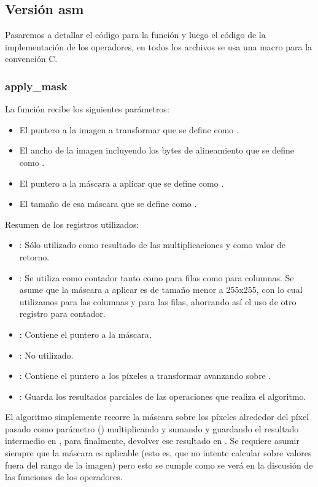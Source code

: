\subsection{Versi\'on asm}
Pasaremos a detallar el c\'odigo para la funci\'on  y luego el c\'odigo de la implementaci\'on de los 
operadores, en todos los archivos se usa una macro para la convenci\'on C.

\subsubsection{apply\_mask}
La funci\'on recibe los siguientes par\'ametros:
\begin{itemize}
	\item El puntero a la imagen a transformar que se define como .
	\item El ancho de la imagen incluyendo los bytes de alineamiento que se define como .
	\item El puntero a la m\'ascara a aplicar que se define como .
	\item El tama\~no de esa m\'ascara que se define como .
\end{itemize}

Resumen de los registros utilizados:
\begin{itemize}
	\item{}: S\'olo utilizado como resultado de las multiplicaciones y como valor de retorno.
	\item{}: Se utiliza como contador tanto como para filas como para columnas. Se asume que la m\'ascara a 
aplicar es de tama\~no menor a 255x255, con lo cual utilizamos  para las columnas y  para las filas, 
ahorrando as\'i el uso de otro registro para contador.
	\item{}: Contiene el puntero a la m\'ascara, 
	\item{}: No utilizado.
	\item{}: Contiene el puntero a los p\'ixeles a transformar avanzando sobre .
	\item{}: Guarda los resultados parciales de las operaciones que realiza el algoritmo.
\end{itemize}

El algoritmo simplemente recorre la m\'ascara sobre los p\'ixeles alrededor del p\'ixel pasado como par\'ametro 
() multiplicando y sumando y guardando el resultado intermedio en , para finalmente, devolver 
ese resultado en . Se requiere asumir siempre que la m\'ascara es aplicable (esto es, que no intente 
calcular sobre valores fuera del rango de la imagen) pero esto se cumple como se ver\'a en la discusi\'on de las 
funciones de los operadores. \\

